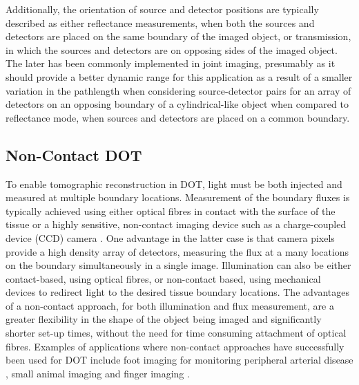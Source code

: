 \documentclass[twoside]{bhamthesis}
\theoremstyle{definition}
\begin{document}
Additionally, the orientation of source and detector positions are typically described as either reflectance measurements, when both the sources and detectors are placed on the same boundary of the imaged object, or transmission, in which the sources and detectors are on opposing sides of the imaged object. The later has been commonly implemented in joint imaging, presumably as it should provide a better dynamic range for this application as a result of a smaller variation in the pathlength when considering source-detector pairs for an array of detectors on an opposing boundary of a cylindrical-like object when compared to reflectance mode, when sources and detectors are placed on a common boundary.

\subsection{Non-Contact DOT}
\label{section:Non-Contact DOT}
To enable tomographic reconstruction in DOT, light must be both injected and measured at multiple boundary locations. Measurement of the boundary fluxes is typically achieved using either optical fibres in contact with the surface of the tissue \cite{eggebrecht2014mapping} or a highly sensitive, non-contact imaging device such as a charge-coupled device (CCD) camera \cite{hielscher2004sagittal}. One advantage in the latter case is that camera pixels provide a high density array of detectors, measuring the flux at a many locations on the boundary simultaneously in a single image. Illumination can also be either contact-based, using optical fibres, or non-contact based, using mechanical devices to redirect light to the desired tissue boundary locations. 
The advantages of a non-contact approach, for both illumination and flux measurement, are a greater flexibility in the shape of the object being imaged and significantly shorter set-up times, without the need for time consuming attachment of optical fibres. Examples of applications where non-contact approaches have successfully been used for DOT include foot imaging for monitoring peripheral arterial disease \cite{hoi2018non}, small animal imaging \cite{guggenheim2013multi,reisman2017structured} and finger imaging \cite{hielscher2004sagittal}.
\end{document}
